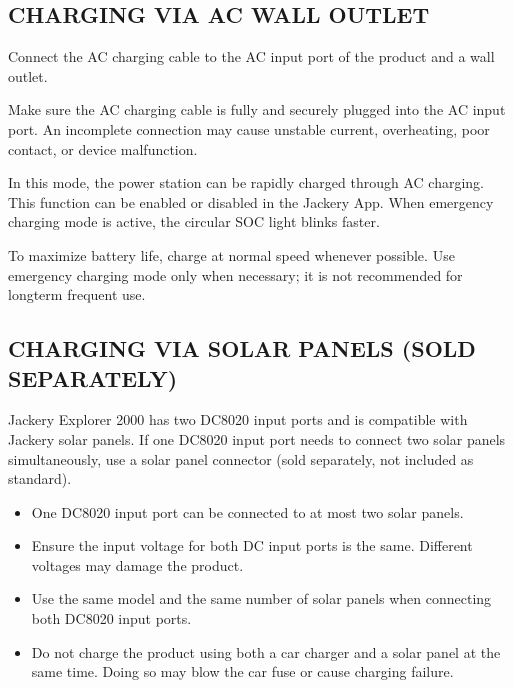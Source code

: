 \documentclass[a4paper,10pt,twoside,openany,english]{sphinxhowto}
\let\sphinxpxdimen\pdfpxdimen\else\newdimen\sphinxpxdimen
\begin{document}
\subsection{CHARGING VIA AC WALL OUTLET}
\label{\detokenize{index:charging-via-ac-wall-outlet}}
\sphinxAtStartPar
Connect the AC charging cable to the AC input port of the product and a wall outlet.

\noindent\sphinxincludegraphics[width=360\sphinxpxdimen]{{fig}.png}

\sphinxAtStartPar
{}

\sphinxAtStartPar
Make sure the AC charging cable is fully and securely plugged into the AC input port.
An incomplete connection may cause unstable current, overheating, poor contact, or device malfunction.

\sphinxAtStartPar
{}

\sphinxAtStartPar
In this mode, the power station can be rapidly charged through AC charging.
This function can be enabled or disabled in the Jackery App.
When emergency charging mode is active, the circular SOC light blinks faster.

\sphinxAtStartPar
To maximize battery life, charge at normal speed whenever possible.
Use emergency charging mode only when necessary; it is not recommended for long\sphinxhyphen{}term frequent use.



\subsection{CHARGING VIA SOLAR PANELS (SOLD SEPARATELY)}
\label{\detokenize{index:charging-via-solar-panels-sold-separately}}
\sphinxAtStartPar
Jackery Explorer 2000 has two DC8020 input ports and is compatible with Jackery solar panels.
If one DC8020 input port needs to connect two solar panels simultaneously,
use a solar panel connector (sold separately, not included as standard).

\noindent\sphinxincludegraphics[width=360\sphinxpxdimen]{{fig}.png}

\sphinxAtStartPar
{}
\begin{itemize}
\item {} 
\sphinxAtStartPar
One DC8020 input port can be connected to at most two solar panels.

\item {} 
\sphinxAtStartPar
Ensure the input voltage for both DC input ports is the same. Different voltages may damage the product.

\item {} 
\sphinxAtStartPar
Use the same model and the same number of solar panels when connecting both DC8020 input ports.

\item {} 
\sphinxAtStartPar
Do not charge the product using both a car charger and a solar panel at the same time.
Doing so may blow the car fuse or cause charging failure.

\end{itemize}
\end{document}
